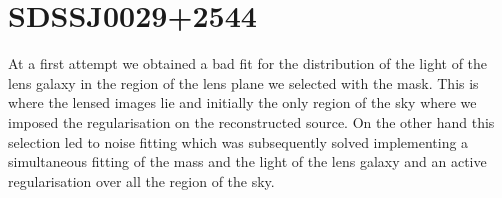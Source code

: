 \documentclass[a4paper,fleqn,usenatbib]{mnras}
\begin{document}
%

\onecolumn
\section{SDSSJ0029+2544}
At a first attempt we obtained a bad fit for the distribution of the light of the lens galaxy in the region of the lens plane we selected with the mask. This is where the lensed images lie and initially the only region of the sky where we imposed the regularisation on the reconstructed source. On the other hand this selection led to noise fitting which was subsequently solved implementing a simultaneous fitting of the mass and the light of the lens galaxy and an active regularisation over all the region of the sky.

\begin{table}
\end{table}
\end{document}
